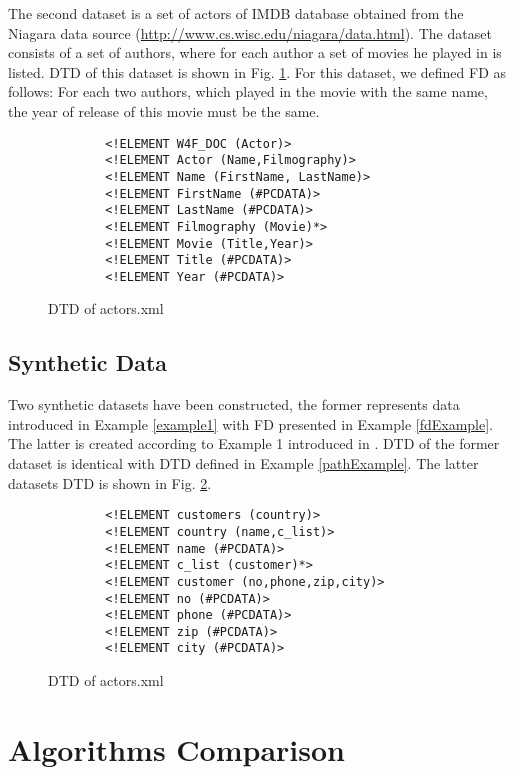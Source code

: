 The second dataset is a set of actors of IMDB database obtained from the Niagara data source (\url{http://www.cs.wisc.edu/niagara/data.html}). The dataset consists of a set of authors, where for each author a set of movies he played in is listed. DTD of this dataset is shown in Fig. \ref{actorsDTD}. For this dataset, we defined FD as follows: For each two authors, which played in the movie with the same name, the year of release of this movie must be the same.

\begin{figure}[H]
    \begin{verbatim}
        <!ELEMENT W4F_DOC (Actor)>
        <!ELEMENT Actor (Name,Filmography)>
        <!ELEMENT Name (FirstName, LastName)>
        <!ELEMENT FirstName (#PCDATA)>
        <!ELEMENT LastName (#PCDATA)>
        <!ELEMENT Filmography (Movie)*>
        <!ELEMENT Movie (Title,Year)>
        <!ELEMENT Title (#PCDATA)>
        <!ELEMENT Year (#PCDATA)>
    \end{verbatim}
    \caption{DTD of actors.xml}
    \label{actorsDTD}
\end{figure}

\subsection{Synthetic Data}

Two synthetic datasets have been constructed, the former represents data introduced in Example \ref{example1} with FD presented in Example \ref{fdExample}. The latter is created according to Example 1 introduced in \cite{ImprovingXML}. DTD of the former dataset is identical with DTD defined in Example \ref{pathExample}. The latter datasets DTD is shown in Fig. \ref{synthDTD}.

\begin{figure}[H]
    \begin{verbatim}
        <!ELEMENT customers (country)>
        <!ELEMENT country (name,c_list)>
        <!ELEMENT name (#PCDATA)>
        <!ELEMENT c_list (customer)*>
        <!ELEMENT customer (no,phone,zip,city)>
        <!ELEMENT no (#PCDATA)>
        <!ELEMENT phone (#PCDATA)>
        <!ELEMENT zip (#PCDATA)>
        <!ELEMENT city (#PCDATA)>
    \end{verbatim}
    \caption{DTD of actors.xml}
    \label{synthDTD}
\end{figure}

\section{Algorithms Comparison}

